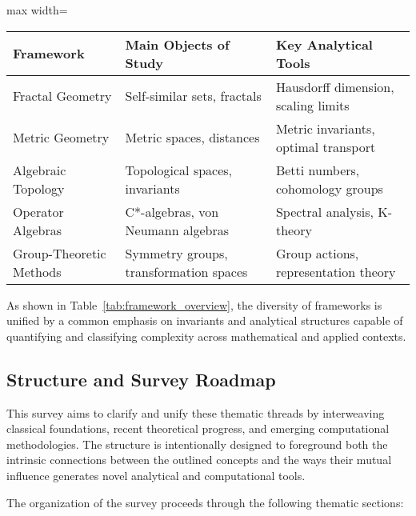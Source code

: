 \begin{table*}[htbp]
\centering
\caption{Principal Frameworks, Core Objects, and Key Analytical Tools}
\label{tab:framework_overview}
\begin{adjustbox}{max width=\textwidth}
\begin{tabular}{lll}
\toprule
\textbf{Framework}         & \textbf{Main Objects of Study}         & \textbf{Key Analytical Tools}             \\
\midrule
Fractal Geometry           & Self-similar sets, fractals            & Hausdorff dimension, scaling limits       \\
Metric Geometry            & Metric spaces, distances                & Metric invariants, optimal transport      \\
Algebraic Topology         & Topological spaces, invariants          & Betti numbers, cohomology groups          \\
Operator Algebras          & C*-algebras, von Neumann algebras       & Spectral analysis, K-theory               \\
Group-Theoretic Methods    & Symmetry groups, transformation spaces  & Group actions, representation theory      \\
\bottomrule
\end{tabular}
\end{adjustbox}
\end{table*}

As shown in Table~\ref{tab:framework_overview}, the diversity of frameworks is unified by a common emphasis on invariants and analytical structures capable of quantifying and classifying complexity across mathematical and applied contexts.

\subsection{Structure and Survey Roadmap}

This survey aims to clarify and unify these thematic threads by interweaving classical foundations, recent theoretical progress, and emerging computational methodologies. The structure is intentionally designed to foreground both the intrinsic connections between the outlined concepts and the ways their mutual influence generates novel analytical and computational tools.

The organization of the survey proceeds through the following thematic sections:


